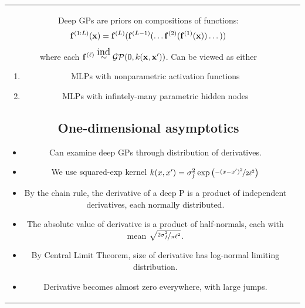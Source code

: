 \documentclass[landscape,a0b,final,a4resizeable]{include/a0poster}
\makeatletter
\newlength{\nonHumbleHeight}
\def\@humbleformat#1{{\settoheight{\nonHumbleHeight}{#1}\resizebox{!}{0.94\nonHumbleHeight}{#1}}}%
\def\humble#1{\@humbleformat{#1}}%
\newcommand{\gp}{{\humble GP}}
\newcommand{\gpt}{{\sc gp}}
\makeatother
\begin{document}
\begin{poster}
\begin{multicols}{3}



\vspace{0.5in} 

\begin{tabular}{cc}
\begin{minipage}[c]{0.73\columnwidth}

Deep GPs are priors on compositions of functions:
\begin{align*}
{\bf{f}}^{(1:L)}({\bf{x}}) = {\bf{f}}^{(L)}({\bf{f}}^{(L-1)}(\dots {\bf{f}}^{(2)}({\bf{f}}^{(1)}({\bf{x}})) \dots))
\end{align*}
%
where each $\vf^{(\ell)} \simind \GPt{0}{k(\vx, \vx')}$. 
Can be viewed as either
\begin{enumerate}
	\item  MLPs with nonparametric activation functions
    \item  MLPs with infintely-many parametric hidden nodes
\end{enumerate}




\subsection*{One-dimensional asymptotics}

\begin{itemize}
\item Can examine deep GPs through distribution of derivatives.
\item We use squared-exp kernel $k(x, x') = \sigma^2_f \exp \left( \nicefrac{-(x - x')^2}{2\ell^2} \right)
$%
\item By the chain rule, the derivative of a deep \gp{} is a product of independent derivatives, each normally distributed.
\item The absolute value of derivative is a product of half-normals, each with mean $\sqrt{\nicefrac{2 \sigma^2_f}{\pi\ell^2}}$.
\item By Central Limit Theorem, size of derivative has log-normal limiting distribution.  
\item Derivative becomes almost zero everywhere, with large jumps.
\end{itemize}


\end{minipage}
\end{tabular}
\end{multicols}
\end{poster}
\end{document}
